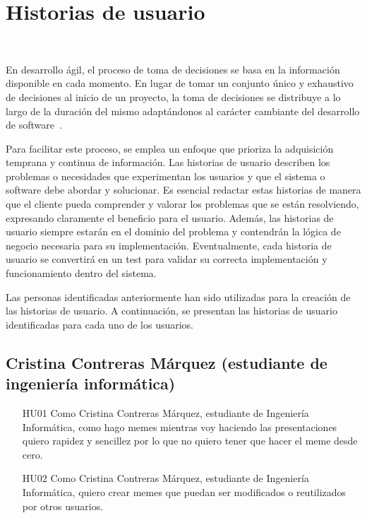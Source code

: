 \section{Historias de usuario}~\label{sec:historias_de_usuario}

    En desarrollo ágil, el proceso de toma de decisiones se basa en la información disponible en cada momento. En lugar de tomar un conjunto único y exhaustivo de decisiones al inicio de un proyecto, la toma de decisiones se distribuye a lo largo de la duración del mismo adaptándonos al carácter cambiante del desarrollo de software~\cite{cohn2004user}.

    Para facilitar este proceso, se emplea un enfoque que prioriza la adquisición temprana y continua de información. Las historias de usuario describen los problemas o necesidades que experimentan los usuarios y que el sistema o software debe abordar y solucionar. Es esencial redactar estas historias de manera que el cliente pueda comprender y valorar los problemas que se están resolviendo, expresando claramente el beneficio para el usuario. Además, las historias de usuario siempre estarán en el dominio del problema y contendrán la lógica de negocio necesaria para su implementación. Eventualmente, cada historia de usuario se convertirá en un test para validar su correcta implementación y funcionamiento dentro del sistema.

    Las personas identificadas anteriormente han sido utilizadas para la creación de las historias de usuario. A continuación, se presentan las historias de usuario identificadas para cada uno de los usuarios.

    \subsection{Cristina Contreras Márquez (estudiante de ingeniería informática)}

        \begin{enumerate}
            \item [HU01] Como Cristina Contreras Márquez, estudiante de Ingeniería Informática, como hago memes mientras voy haciendo las presentaciones quiero rapidez y sencillez por lo que no quiero tener que hacer el meme desde cero.
            \item [HU02] Como Cristina Contreras Márquez, estudiante de Ingeniería Informática, quiero crear memes que puedan ser modificados o reutilizados por otros usuarios.
        \end{enumerate}

